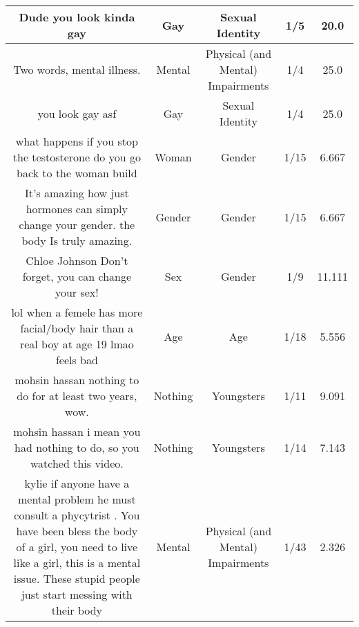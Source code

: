 \documentclass[11pt]{article}
\newlength\mylength
\begin{document}
\begin{center}
\begin{longtable}{|C{.40\mylength}|C{.30\mylength}|C{.15\mylength}|C{.15\mylength}|C{.15\mylength}|}
  Dude you look kinda gay  & Gay & Sexual Identity & 1/5 & 20.0 \\  \hline
  Two words, mental illness.  & Mental & Physical (and Mental) Impairments & 1/4 & 25.0 \\  \hline
  you look gay asf  & Gay & Sexual Identity & 1/4 & 25.0 \\  \hline
  what happens if you stop the testosterone do you go back to the woman build  & Woman & Gender & 1/15 & 6.667 \\  \hline
  It's amazing how just hormones can simply change your gender. the body Is truly amazing.  & Gender & Gender & 1/15 & 6.667 \\  \hline
  Chloe Johnson Don't forget, you can change your sex!  & Sex & Gender & 1/9 & 11.111 \\  \hline
  lol when a femele has more facial/body hair than a real boy at age 19 lmao feels bad  & Age & Age & 1/18 & 5.556 \\  \hline
  mohsin hassan nothing to do for at least two years, wow.  & Nothing & Youngsters & 1/11 & 9.091 \\  \hline
  mohsin hassan i mean you had nothing to do, so you watched this video.  & Nothing & Youngsters & 1/14 & 7.143 \\  \hline
  kylie if anyone have a mental problem he must consult a phycytrist . You have been bless the body of a girl, you need to live like a girl, this is a mental issue. These stupid people just start messing with their body    & Mental & Physical (and Mental) Impairments & 1/43 & 2.326 \\  \hline

\end{longtable}
\end{center}
\end{document}
